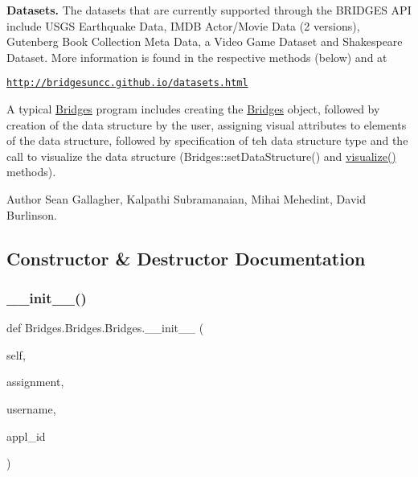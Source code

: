 {\bfseries Datasets.} The datasets that are currently supported through the B\+R\+I\+D\+G\+ES A\+PI include U\+S\+GS Earthquake Data, I\+M\+DB Actor/\+Movie Data (2 versions), Gutenberg Book Collection Meta Data, a Video Game Dataset and Shakespeare Dataset. More information is found in the respective methods (below) and at 

\href{http://bridgesuncc.github.io/datasets.html}{\tt http\+://bridgesuncc.\+github.\+io/datasets.\+html} 

A typical \mbox{\hyperlink{class_bridges_1_1_bridges_1_1_bridges}{Bridges}} program includes creating the \mbox{\hyperlink{class_bridges_1_1_bridges_1_1_bridges}{Bridges}} object, followed by creation of the data structure by the user, assigning visual attributes to elements of the data structure, followed by specification of teh data structure type and the call to visualize the data structure (Bridges\+::set\+Data\+Structure() and \mbox{\hyperlink{class_bridges_1_1_bridges_1_1_bridges_a7503d1902eee682a0661271c070978c1}{visualize()}} methods).

\begin{DoxyAuthor}{Author}
Sean Gallagher, Kalpathi Subramanaian, Mihai Mehedint, David Burlinson. 
\end{DoxyAuthor}


\subsection{Constructor \& Destructor Documentation}
\mbox{\label{class_bridges_1_1_bridges_1_1_bridges_ada234978079456870bf2212eaa1be938}} 
\subsubsection{\texorpdfstring{\+\_\+\+\_\+init\+\_\+\+\_\+()}{\_\_init\_\_()}}
{\footnotesize\ttfamily def Bridges.\+Bridges.\+Bridges.\+\_\+\+\_\+init\+\_\+\+\_\+ (\begin{DoxyParamCaption}\item[{}]{self,  }\item[{}]{assignment,  }\item[{}]{username,  }\item[{}]{appl\+\_\+id }\end{DoxyParamCaption})}



